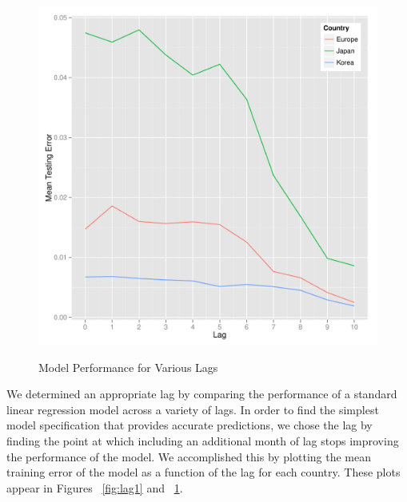 \documentclass{sig-alternate-05-2015}
\begin{document}
\begin{figure}
\centering
\caption{Model Performance for Various Lags}
\includegraphics[scale=0.45]{lag2.pdf}
\label{fig:lag2}
\end{figure}



We determined an appropriate lag by comparing the performance of a standard linear regression model across a variety of lags. In order to find the simplest model specification that provides accurate predictions, we chose the lag by finding the point at which including an additional month of lag stops improving the performance of the model. We accomplished this by plotting the mean training error of the model as a function of the lag for each country. These plots appear in Figures ~\ref{fig:lag1} and ~\ref{fig:lag2}. %
\end{document}
